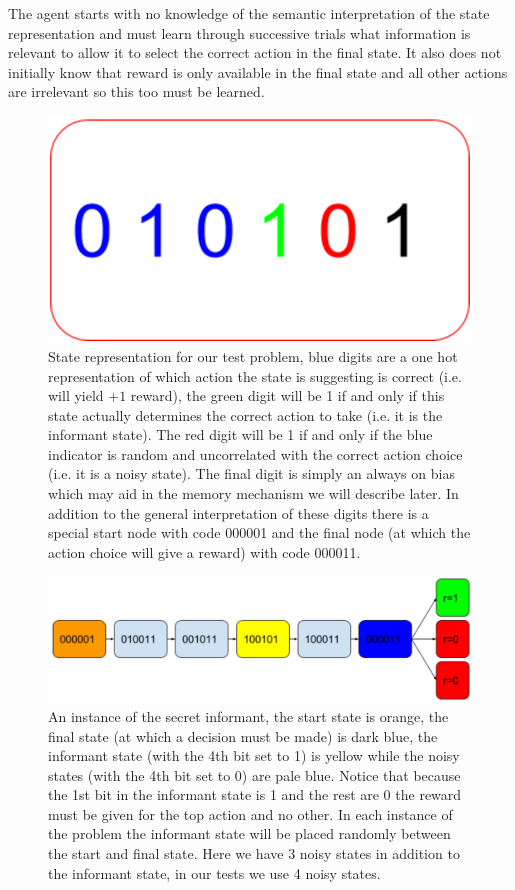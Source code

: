 \documentclass{article}
\begin{document}
The agent starts with no knowledge of the semantic interpretation of the state representation and must learn through successive trials what information is relevant to allow it to select the correct action in the final state. It also does not initially know that reward is only available in the final state and all other actions are irrelevant so this too must be learned. 
\begin{figure}[!ht]
\includegraphics[width=1\textwidth]{images/state.png}
\caption{State representation for our test problem, blue digits are a one hot representation of which action the state is suggesting is correct (i.e. will yield $+1$ reward), the green digit will be 1 if and only if this state actually determines the correct action to take (i.e. it is the informant state). The red digit will be 1 if and only if the blue indicator is random and uncorrelated with the correct action choice (i.e. it is a noisy state). The final digit is simply an always on bias which may aid in the memory mechanism we will describe later. In addition to the general interpretation of these digits there is a special start node with code 000001 and the final node (at which the action choice will give a reward) with code 000011.}
\label{fig:state}
\end{figure}

\begin{figure}[!ht]
\includegraphics[width=1\textwidth]{images/problem.png}
\caption{An instance of the secret informant, the start state is orange, the final state (at which a decision must be made) is dark blue, the informant state (with the 4th bit set to 1) is yellow while the noisy states (with the 4th bit set to 0) are pale blue. Notice that because the 1st bit in the informant state is 1 and the rest are 0 the reward must be given for the top action and no other. In each instance of the problem the informant state will be placed randomly between the start and final state. Here we have 3 noisy states in addition to the informant state, in our tests we use 4 noisy states.}
\label{fig:problem}
\end{figure}
\end{document}
